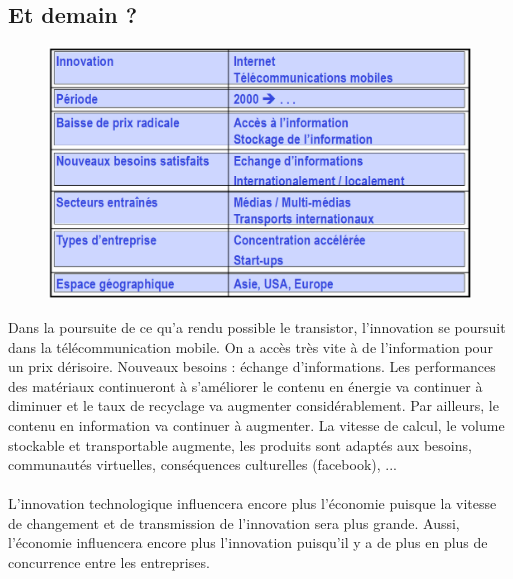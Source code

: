 \subsection{Et demain ?}
\begin{figure}
\includegraphics[scale=0.35]{63}
\end{figure}
Dans la poursuite de ce qu'a rendu possible le transistor, l'innovation se poursuit dans la télécommunication mobile. On a accès très vite à de l'information pour un prix dérisoire. Nouveaux besoins : échange d'informations. Les performances des matériaux continueront à s’améliorer le contenu en énergie va continuer à diminuer et le taux de recyclage va augmenter considérablement. Par ailleurs, le contenu en information va continuer à augmenter. La vitesse de calcul, le volume stockable et transportable augmente, les produits sont adaptés aux besoins, communautés virtuelles, conséquences culturelles (facebook), ... 
\\\\
L’innovation technologique influencera encore plus
l’économie puisque la vitesse de changement et de transmission de l'innovation sera plus grande. Aussi, l'économie influencera encore plus l'innovation puisqu'il y a de plus en plus de concurrence entre les entreprises. 

